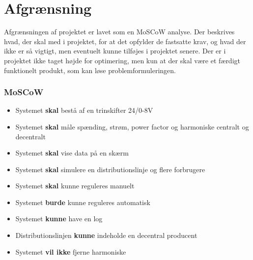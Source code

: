 

\section{Afgrænsning}
Afgrænsningen af projektet er lavet som en MoSCoW analyse. Der beskrives hvad, der skal med i projektet, for at det opfylder de fastsatte krav, og hvad der ikke er så vigtigt, men eventuelt kunne tilføjes i projektet senere. Der er i projektet ikke taget højde for optimering, men kun at der skal være et færdigt funktionelt produkt, som kan løse problemformuleringen.
\subsubsection{MoSCoW}

\begin{itemize}
	\item{Systemet \textbf{skal} bestå af en trinskifter 24/0-8V}
	\item{Systemet \textbf{skal} måle spænding, strøm, power factor og harmoniske centralt og decentralt}
	\item{Systemet \textbf{skal} vise data på en skærm}
	\item{Systemet \textbf{skal} simulere en distributionslinje og flere forbrugere}
	\item{Systemet \textbf{skal} kunne reguleres manuelt}
	\item{Systemet \textbf{burde} kunne reguleres automatisk}
	\item{Systemet \textbf{kunne} have en log}
	\item{Distributionslinjen \textbf{kunne} indeholde en decentral producent}
	\item{Systemet \textbf{vil ikke} fjerne harmoniske} 
\end{itemize}	